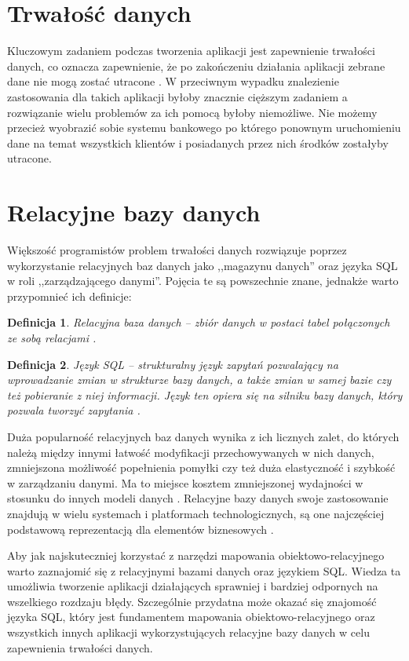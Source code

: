 \documentclass[12pt]{report}
\newtheorem{definition}{Definicja}
\begin{document}
\section{Trwałość danych}

Kluczowym zadaniem podczas tworzenia aplikacji jest zapewnienie trwałości da\-nych, co oznacza zapewnienie, że po zakończeniu działania aplikacji zebrane dane nie mogą
zostać utracone \cite{persistence}. W przeciwnym wypadku znalezienie zastosowania dla takich aplikacji byłoby znacznie cięższym zadaniem a rozwiązanie wielu problemów 
za ich pomocą byłoby niemożliwe. Nie możemy przecież wyobrazić sobie systemu bankowego po którego ponownym uruchomieniu dane na temat wszystkich klientów i
posiadanych przez nich środków zostałyby utracone.

\section{Relacyjne bazy danych}

Większość programistów problem trwałości danych rozwiązuje poprzez wykorzystanie relacyjnych baz danych jako ,,magazynu danych'' oraz języka SQL w roli ,,zarządzającego
danymi''. Pojęcia te są powszechnie znane, jednakże warto przypomnieć ich definicje:

\begin{definition}
Relacyjna baza danych -- zbiór danych w postaci tabel połączonych ze sobą relacjami \cite{rel}.
\end{definition}

\begin{definition}
Język SQL -- strukturalny język zapytań pozwalający na wprowadzanie zmian w strukturze bazy danych, a także zmian w samej bazie czy też pobieranie z niej informacji. Język 
ten opiera się na silniku bazy danych, który pozwala tworzyć zapytania \cite{sql}.
\end{definition}

Duża popularność relacyjnych baz danych wynika z ich licznych zalet, do któ\-rych należą między innymi łatwość modyfikacji przechowywanych w nich danych, zmniejszona
możliwość popełnienia pomyłki czy też duża elastyczność i szybkość w zarządzaniu danymi. Ma to miejsce kosztem zmniejszonej wydajności w stosunku do innych modeli
danych \cite{persistence}. Relacyjne bazy danych swoje zastosowanie znajdują w wielu systemach i platformach technologicznych, są one najczęściej podstawową 
reprezentacją dla elementów biznesowych \cite{hibernate}.

Aby jak najskuteczniej korzystać z narzędzi mapowania obiektowo-relacyjnego warto zaznajomić się z relacyjnymi bazami danych oraz językiem SQL. Wiedza ta umożliwia
tworzenie aplikacji działających sprawniej i bardziej odpornych na wszelkiego rozdzaju błędy. Szczególnie przydatna może okazać się znajomość języka SQL, który jest 
fundamentem mapowania obiektowo-relacyjnego oraz wszystkich innych aplikacji wykorzystujących relacyjne bazy danych w celu zapewnienia trwałości danych.
\end{document}
